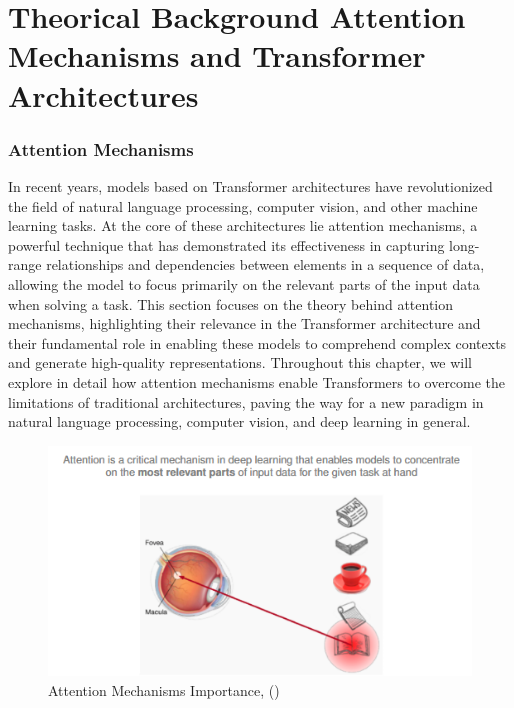 \chapter{Theorical Background Attention Mechanisms and Transformer Architectures} \label{ch:chapter_2}

\subsection{Attention Mechanisms}

In recent years, models based on Transformer architectures have revolutionized the field of natural language processing, computer vision, and other machine learning tasks. At the core of these architectures lie attention mechanisms, a powerful technique that has demonstrated its effectiveness in capturing long-range relationships and dependencies between elements in a sequence of data, allowing the model to focus primarily on the relevant parts of the input data when solving a task. This section focuses on the theory behind attention mechanisms, highlighting their relevance in the Transformer architecture and their fundamental role in enabling these models to comprehend complex contexts and generate high-quality representations. Throughout this chapter, we will explore in detail how attention mechanisms enable Transformers to overcome the limitations of traditional architectures, paving the way for a new paradigm in natural language processing, computer vision, and deep learning in general.

\newpage

\begin{figure}[h!]
    \centering%
    \includegraphics[width=\linewidth]{Figures/background/Attention_Mechanisms_Importance.png}
    \caption{Attention Mechanisms Importance, (\cite{goodfellow2016dive})}
    \label{fig:attention}
\end{figure}


